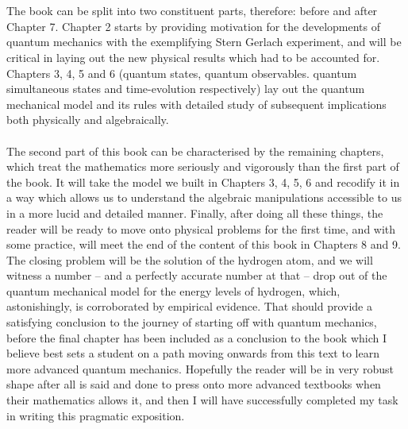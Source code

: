 \\\\
The book can be split into two constituent parts, therefore: before and after Chapter 7. Chapter 2 starts by providing motivation for the developments of quantum mechanics with the exemplifying Stern Gerlach experiment, and will be critical in laying out the new physical results which had to be accounted for. Chapters 3, 4, 5 and 6 (quantum states, quantum observables. quantum simultaneous states and time-evolution respectively) lay out the quantum mechanical model and its rules with detailed study of subsequent implications both physically and algebraically. 
\\\\
The second part of this book can be characterised by the remaining chapters, which treat the mathematics more seriously and vigorously than the first part of the book. It will take the model we built in Chapters 3, 4, 5, 6 and recodify it in a way which allows us to understand the algebraic manipulations accessible to us in a more lucid and detailed manner. Finally, after doing all these things, the reader will be ready to move onto physical problems for the first time, and with some practice, will meet the end of the content of this book in Chapters 8 and 9. The closing problem will be the solution of the hydrogen atom, and we will witness a number -- and a perfectly accurate number at that -- drop out of the quantum mechanical model for the energy levels of hydrogen, which, astonishingly, is corroborated by empirical evidence. That should provide a satisfying conclusion to the journey of starting off with quantum mechanics, before the final chapter has been included as a conclusion to the book which I believe best sets a student on a path moving onwards from this text to learn more advanced quantum mechanics.  Hopefully the reader will be in very robust shape after all is said and done to press onto more advanced textbooks when their mathematics allows it, and then I will have successfully completed my task in writing this pragmatic exposition.

\tableofcontents
